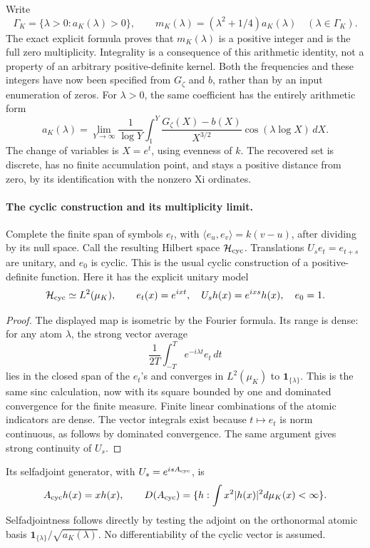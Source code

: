Write
\[
 \Gamma_K=\{\lambda>0:a_K(\lambda)>0\},\qquad
 m_K(\lambda)=(\lambda^2+1/4)a_K(\lambda)
 \quad(\lambda\in\Gamma_K).
\]
The exact explicit formula proves that \(m_K(\lambda)\) is a
positive integer and is the full zero multiplicity.
Integrality is a consequence of this arithmetic identity, not a
property of an arbitrary positive-definite kernel.
Both the frequencies and these integers have now been specified
from \(G_\zeta\) and \(b\), rather than by an input enumeration of zeros.
For \(\lambda>0\), the same coefficient has the entirely arithmetic form
\[
 a_K(\lambda)=
 \lim_{Y\to\infty}\frac1{\log Y}
 \int_1^Y
 \frac{G_\zeta(X)-b(X)}{X^{3/2}}
       \cos(\lambda\log X)\,dX.
\]
The change of variables is \(X=e^t\), using evenness of \(k\).
The recovered set is discrete, has no finite accumulation point,
and stays a positive distance from zero, by its identification with
the nonzero Xi ordinates.

\paragraph{The cyclic construction and its multiplicity limit.}
Complete the finite span of symbols \(e_t\), with
\(\langle e_u,e_v\rangle=k(v-u)\), after dividing by its null space.
Call the resulting Hilbert space \(\mathcal H_{\rm cyc}\).
Translations \(U_se_t=e_{t+s}\) are unitary, and \(e_0\) is cyclic.
This is the usual cyclic construction of a positive-definite function.
Here it has the explicit unitary model
\[
 \mathcal H_{\rm cyc}\simeq L^2(\mu_K),\qquad
 e_t(x)=e^{ixt},\quad U_sh(x)=e^{ixs}h(x),\quad e_0=1.
\]
\begin{proof}
The displayed map is isometric by the Fourier formula.
Its range is dense: for any atom \(\lambda\), the strong vector average
\[
 \frac1{2T}\int_{-T}^{T}e^{-i\lambda t}e_t\,dt
\]
lies in the closed span of the \(e_t\)'s and converges in
\(L^2(\mu_K)\) to \(\mathbf1_{\{\lambda\}}\).
This is the same sinc calculation, now with its square bounded
by one and dominated convergence for the finite measure.
Finite linear combinations of the atomic indicators are dense.
The vector integrals exist because \(t\mapsto e_t\) is norm
continuous, as follows by dominated convergence.
The same argument gives strong continuity of \(U_s\).
\end{proof}
Its selfadjoint generator, with \(U_s=e^{isA_{\rm cyc}}\), is
\[
 A_{\rm cyc}h(x)=xh(x),\qquad
 D(A_{\rm cyc})=\{h:\int x^2|h(x)|^2d\mu_K(x)<\infty\}.
\]
Selfadjointness follows directly by testing the adjoint on the
orthonormal atomic basis
\(\mathbf1_{\{\lambda\}}/\sqrt{a_K(\lambda)}\).
No differentiability of the cyclic vector is assumed.

